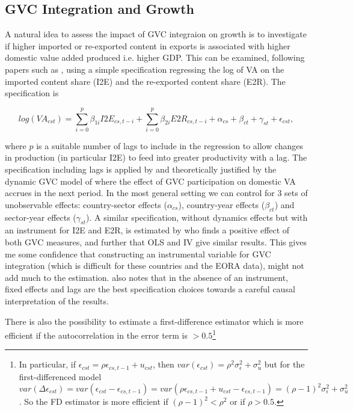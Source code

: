 \documentclass[a4paper]{article}
\begin{document}
\subsection{GVC Integration and  Growth}

A natural idea to assess the impact of GVC integraion on growth is to investigate if higher imported or re-exported content in exports is associated with higher domestic value added produced i.e. higher GDP. This can be examined, following papers such as \citet{kummritz2015global}, using a simple specification regressing the log of VA on the imported content share (I2E) and the re-exported content share (E2R). The specification is

\begin{equation} \label{eq:GROWTH_HDFE}
log(VA_{cst}) = \sum_{i=0}^p \beta_{1i} I2E_{cs,t-i} + \sum_{i = 0}^p \beta_{2i} E2R_{cs,t-i}  + \alpha_{cs} + \beta_{ct} +\gamma_{st} + \epsilon_{cst},
\end{equation}

where $p$ is a suitable number of lags to include in the regression to allow changes in production (in particular I2E) to feed into greater productivity with a lag. The specification including lags is applied by \citet{kummritz2015global} and theoretically justified by the dynamic GVC model of \citet{LiLiu2015moving} where the effect of GVC participation on domestic VA accrues in the next period. In the most general setting we can control for 3 sets of unobservable effects: country-sector effects ($\alpha_{cs}$), country-year effects ($\beta_{ct}$) and sector-year effects ($\gamma_{st}$). A similar specification, without dynamics effects but with an instrument for I2E and E2R, is estimated by \citet{Kummritz20161} who finds a positive effect of both GVC measures, and further that OLS and IV give similar results. This gives me some confidence that constructing an instrumental variable for GVC integration (which is difficult for these countries and the EORA data), might not add much to the estimation. \citet{kummritz2015global} also notes that in the absence of an instrument, fixed effects and lags are the best specification choices towards a careful causal interpretation of the results.  \newline

 There is also the possibility to estimate a first-difference estimator which is more efficient if the autocorrelation in the error term is $> 0.5$\footnote{In particular, if $\epsilon_{cst} = \rho \epsilon_{cs,t-1} + u_{cst}$, then $var(\epsilon_{cst}) = \rho^2 \sigma^2_\epsilon + \sigma^2_u$ but for the first-differenced model $var(\Delta \epsilon_{cst}) = var(\epsilon_{cst} - \epsilon_{cs,t-1}) = var(\rho \epsilon_{cs,t-1} + u_{cst} - \epsilon_{cs,t-1}) = (\rho-1)^2 \sigma^2_\epsilon + \sigma^2_u$. So the FD estimator is more efficient if $(\rho-1)^2<\rho^2$ or if $\rho > 0.5$. } 
\end{document}
